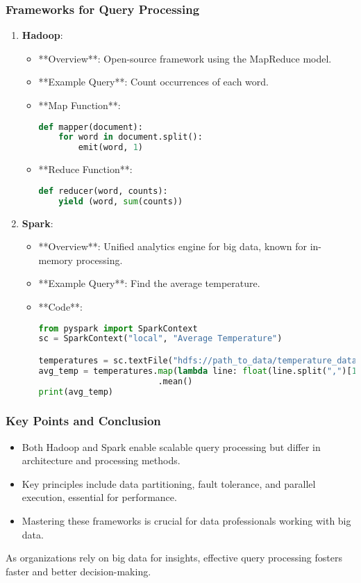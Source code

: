 \documentclass[aspectratio=169]{beamer}
\begin{document}
\begin{frame}[fragile]
    \frametitle{Frameworks for Query Processing}
    \begin{enumerate}
        \item \textbf{Hadoop}:
        \begin{itemize}
            \item **Overview**: Open-source framework using the MapReduce model.
            \item **Example Query**: Count occurrences of each word.
            \item **Map Function**:
            \begin{lstlisting}[language=Python]
def mapper(document):
    for word in document.split():
        emit(word, 1)
            \end{lstlisting}
            \item **Reduce Function**:
            \begin{lstlisting}[language=Python]
def reducer(word, counts):
    yield (word, sum(counts))
            \end{lstlisting}
        \end{itemize}

        \item \textbf{Spark}:
        \begin{itemize}
            \item **Overview**: Unified analytics engine for big data, known for in-memory processing.
            \item **Example Query**: Find the average temperature.
            \item **Code**:
            \begin{lstlisting}[language=Python]
from pyspark import SparkContext
sc = SparkContext("local", "Average Temperature")

temperatures = sc.textFile("hdfs://path_to_data/temperature_data.csv")
avg_temp = temperatures.map(lambda line: float(line.split(",")[1]))\
                        .mean()
print(avg_temp)
            \end{lstlisting}
        \end{itemize}
    \end{enumerate}
\end{frame}

\begin{frame}[fragile]
    \frametitle{Key Points and Conclusion}
    \begin{itemize}
        \item Both Hadoop and Spark enable scalable query processing but differ in architecture and processing methods.
        \item Key principles include data partitioning, fault tolerance, and parallel execution, essential for performance.
        \item Mastering these frameworks is crucial for data professionals working with big data.
    \end{itemize}
    As organizations rely on big data for insights, effective query processing fosters faster and better decision-making.
\end{frame}
\end{document}
